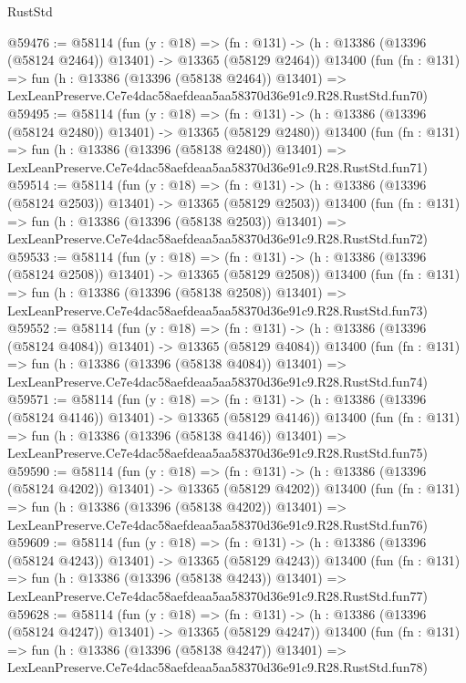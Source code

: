 \begin{lexlean}{RustStd}
\begin{coremodule}
@59476 := @58114
    (fun (y : @18) =>
    (fn : @131) -> (h : @13386 (@13396 (@58124 @2464)) @13401) -> @13365 (@58129 @2464))
    @13400
    (fun (fn : @131) =>
    fun (h : @13386 (@13396 (@58138 @2464)) @13401) =>
    LexLeanPreserve.Ce7e4dac58aefdeaa5aa58370d36e91c9.R28.RustStd.fun70)
@59495 := @58114
    (fun (y : @18) =>
    (fn : @131) -> (h : @13386 (@13396 (@58124 @2480)) @13401) -> @13365 (@58129 @2480))
    @13400
    (fun (fn : @131) =>
    fun (h : @13386 (@13396 (@58138 @2480)) @13401) =>
    LexLeanPreserve.Ce7e4dac58aefdeaa5aa58370d36e91c9.R28.RustStd.fun71)
@59514 := @58114
    (fun (y : @18) =>
    (fn : @131) -> (h : @13386 (@13396 (@58124 @2503)) @13401) -> @13365 (@58129 @2503))
    @13400
    (fun (fn : @131) =>
    fun (h : @13386 (@13396 (@58138 @2503)) @13401) =>
    LexLeanPreserve.Ce7e4dac58aefdeaa5aa58370d36e91c9.R28.RustStd.fun72)
@59533 := @58114
    (fun (y : @18) =>
    (fn : @131) -> (h : @13386 (@13396 (@58124 @2508)) @13401) -> @13365 (@58129 @2508))
    @13400
    (fun (fn : @131) =>
    fun (h : @13386 (@13396 (@58138 @2508)) @13401) =>
    LexLeanPreserve.Ce7e4dac58aefdeaa5aa58370d36e91c9.R28.RustStd.fun73)
@59552 := @58114
    (fun (y : @18) =>
    (fn : @131) -> (h : @13386 (@13396 (@58124 @4084)) @13401) -> @13365 (@58129 @4084))
    @13400
    (fun (fn : @131) =>
    fun (h : @13386 (@13396 (@58138 @4084)) @13401) =>
    LexLeanPreserve.Ce7e4dac58aefdeaa5aa58370d36e91c9.R28.RustStd.fun74)
@59571 := @58114
    (fun (y : @18) =>
    (fn : @131) -> (h : @13386 (@13396 (@58124 @4146)) @13401) -> @13365 (@58129 @4146))
    @13400
    (fun (fn : @131) =>
    fun (h : @13386 (@13396 (@58138 @4146)) @13401) =>
    LexLeanPreserve.Ce7e4dac58aefdeaa5aa58370d36e91c9.R28.RustStd.fun75)
@59590 := @58114
    (fun (y : @18) =>
    (fn : @131) -> (h : @13386 (@13396 (@58124 @4202)) @13401) -> @13365 (@58129 @4202))
    @13400
    (fun (fn : @131) =>
    fun (h : @13386 (@13396 (@58138 @4202)) @13401) =>
    LexLeanPreserve.Ce7e4dac58aefdeaa5aa58370d36e91c9.R28.RustStd.fun76)
@59609 := @58114
    (fun (y : @18) =>
    (fn : @131) -> (h : @13386 (@13396 (@58124 @4243)) @13401) -> @13365 (@58129 @4243))
    @13400
    (fun (fn : @131) =>
    fun (h : @13386 (@13396 (@58138 @4243)) @13401) =>
    LexLeanPreserve.Ce7e4dac58aefdeaa5aa58370d36e91c9.R28.RustStd.fun77)
@59628 := @58114
    (fun (y : @18) =>
    (fn : @131) -> (h : @13386 (@13396 (@58124 @4247)) @13401) -> @13365 (@58129 @4247))
    @13400
    (fun (fn : @131) =>
    fun (h : @13386 (@13396 (@58138 @4247)) @13401) =>
    LexLeanPreserve.Ce7e4dac58aefdeaa5aa58370d36e91c9.R28.RustStd.fun78)

\end{coremodule}
\end{lexlean}
